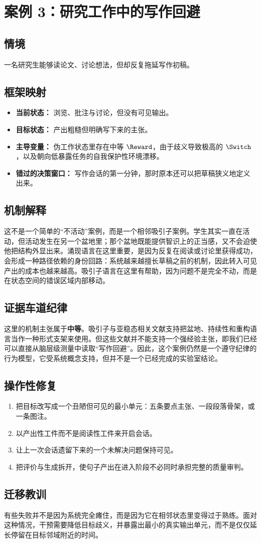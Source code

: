 \section{案例 3：研究工作中的写作回避}

\subsection*{情境}
一名研究生能够读论文、讨论想法，但却反复拖延写作初稿。

\subsection*{框架映射}
\begin{itemize}[nosep]
  \item \textbf{当前状态：} 浏览、批注与讨论，但没有可见输出。
  \item \textbf{目标状态：} 产出粗糙但明确写下来的主张。
  \item \textbf{主导变量：} 伪工作状态里存在中等 $\Reward$，由于歧义导致极高的 $\Switch$，以及朝向低暴露任务的自我保护性环境漂移。
  \item \textbf{错过的决策窗口：} 写作会话的第一分钟，那时原本还可以把草稿狭义地定义出来。
\end{itemize}

\subsection*{机制解释}
这不是一个简单的“不活动”案例，而是一个相邻吸引子案例。学生其实一直在活动，但活动发生在另一个盆地里；那个盆地既能提供智识上的正当感，又不会迫使他把结构外显出来。涌现语言在这里重要，是因为反复在阅读或讨论里获得成功，会形成一种路径依赖的身份回路：系统越来越擅长草稿之前的机制，因此转入可见产出的成本也越来越高。吸引子语言在这里有帮助，因为问题不是完全不动，而是在状态空间的错误区域内部移动。

\subsection*{证据车道纪律}
这里的机制主张属于\textbf{中等}。吸引子与亚稳态相关文献支持把盆地、持续性和重构语言当作一种形式支架来使用。但这些文献并不能支持一个强经验主张，即我们已经可以直接从脑层级测量中读取“写作回避”。因此，这个案例仍然是一个遵守纪律的行为模型，它受系统概念支持，但并不是一个已经完成的实验室结论。

\subsection*{操作性修复}
\begin{enumerate}[nosep]
  \item 把目标改写成一个丑陋但可见的最小单元：五条要点主张、一段段落骨架，或一条图注。
  \item 以产出性工件而不是阅读性工件来开启会话。
  \item 让上一次会话遗留下来的一个未解决问题保持可见。
  \item 把评价与生成拆开，使句子产出在进入阶段不必同时承担完整的质量审判。
\end{enumerate}

\subsection*{迁移教训}
有些失败并不是因为系统完全瘫住，而是因为它在相邻状态里变得过于熟练。面对这种情况，干预需要降低目标歧义，并暴露出最小的真实输出单元，而不是仅仅延长停留在目标邻域附近的时间。